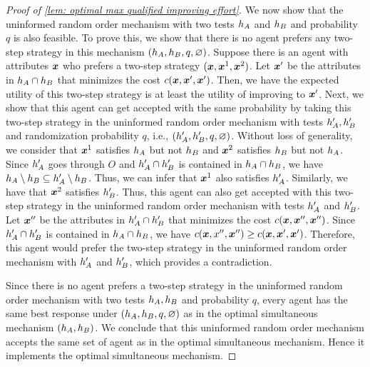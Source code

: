 \begin{proof}[Proof of \cref{lem: optimal max qualified improving effort}]
    We now show that the uninformed random order mechanism with two tests $h_A$ and $h_B$ and probability $q$ is also feasible. To prove this, we show that there is no agent prefers any two-step strategy in this mechanism $(h_A,h_B,q,\varnothing)$. Suppose there is an agent with attributes $\boldsymbol{x}$ who prefers a two-step strategy $(\boldsymbol{x}, \boldsymbol{x}^1, \boldsymbol{x}^2)$. Let $\boldsymbol{x}'$ be the attributes in $h_A \cap h_B$ that minimizes the cost $c(\boldsymbol{x},\boldsymbol{x}',\boldsymbol{x}')$. Then, we have the expected utility of this two-step strategy is at least the utility of improving to $\boldsymbol{x}'$. 
    Next, we show that this agent can get accepted with the same probability by taking this two-step strategy in the uninformed random order mechanism with tests $h_A',h_B'$ and randomization probability $q$, i.e., $(h_A',h_B',q,\varnothing)$. 
    Without loss of generality, we consider that $\boldsymbol{x}^1$ satisfies $h_A$ but not $h_B$ and $\boldsymbol{x}^2$ satisfies $h_B$ but not $h_A$. Since $h_A'$ goes through $O$ and $h_A' \cap h_B'$ is contained in $h_A \cap h_B$, we have $h_A \setminus h_B \subseteq h_A' \setminus h_B$. Thus, we can infer that $\boldsymbol{x}^1$ also satisfies $h_A'$. Similarly, we have that $\boldsymbol{x}^2$ satisfies $h_B'$. Thus, this agent can also get accepted with this two-step strategy in the uninformed random order mechanism with tests $h_A'$ and $h_B'$. 
    Let $\boldsymbol{x}''$ be the attributes in $h_A' \cap h_B'$ that minimizes the cost $c(\boldsymbol{x},\boldsymbol{x}'',\boldsymbol{x}'')$.
    Since $h_A' \cap h_B'$ is contained in $h_A \cap h_B$, we have $c(\boldsymbol{x},x'',\boldsymbol{x}'') \geq c(\boldsymbol{x}, \boldsymbol{x}',\boldsymbol{x}')$. Therefore, this agent would prefer the two-step strategy in the uninformed random order mechanism with $h_A'$ and $h_B'$, which provides a contradiction.

    Since there is no agent prefers a two-step strategy in the uninformed random order mechanism with two tests $h_A,h_B$ and probability $q$, every agent has the same best response under $(h_A,  h_B,q,\varnothing)$  as in the optimal simultaneous mechanism $(h_A,  h_B)$.
    We conclude that 
    this uninformed random order mechanism accepts the same set of agent as in the optimal simultaneous mechanism. 
    Hence it implements the optimal simultaneous mechanism. 
\end{proof}


